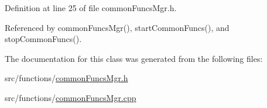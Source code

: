 Definition at line 25 of file commonFuncsMgr.h.



Referenced by commonFuncsMgr(), startCommonFuncs(), and stopCommonFuncs().



The documentation for this class was generated from the following files:\begin{DoxyCompactItemize}
\item 
src/functions/\hyperlink{commonFuncsMgr_8h}{commonFuncsMgr.h}\item 
src/functions/\hyperlink{commonFuncsMgr_8cpp}{commonFuncsMgr.cpp}\end{DoxyCompactItemize}
